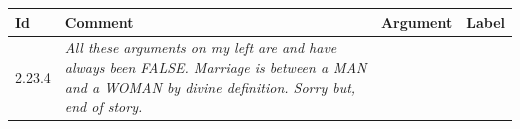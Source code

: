 \begin{table}[t]
{\small
\begin{tabular}{@{}lp{9.5cm}p{3.5cm}c@{}}
\toprule
Id & Comment & Argument & Label \\
\midrule
2.23.4 & \normalsize{%
\textit{
All these arguments on my left are and have always been FALSE. Marriage is
between a MAN and a WOMAN by divine definition. Sorry but, end of story.
}}


\end{tabular}}
\end{table}
